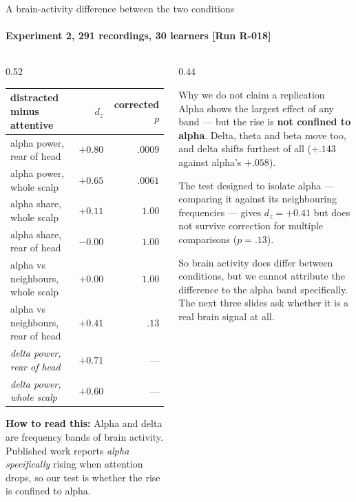 \documentclass[aspectratio=169,10pt]{beamer}
\makeatletter
\newcommand{\runtag}[1]{{\scriptsize\color{mubeamer@gray7}[#1]}}
\newcommand{\sidenote}[1]{{\scriptsize\color{mubeamer@gray7}\sloppy\par#1\par}}
\newcommand{\reads}[1]{\textbf{How to read this:} #1}
\makeatother
\begin{document}
\begin{frame}{A brain-activity difference between the two conditions}
  \framesubtitle{Experiment 2, 291 recordings, 30 learners \runtag{Run R-018}}
  \begin{columns}[T]
    \begin{column}{0.52\textwidth}
      \scriptsize
      \begin{tabular}{@{}lrr@{}}
        \toprule
        distracted minus attentive & $d_z$ & corrected $p$ \\
        \midrule
        alpha power, rear of head  & $+0.80$ & $.0009$ \\
        alpha power, whole scalp   & $+0.65$ & $.0061$ \\
        alpha share, whole scalp   & $+0.11$ & $1.00$ \\
        alpha share, rear of head  & $-0.00$ & $1.00$ \\
        alpha vs neighbours, whole scalp & $+0.00$ & $1.00$ \\
        alpha vs neighbours, rear of head & $+0.41$ & $.13$ \\
        \midrule
        \textit{delta power, rear of head} & $+0.71$ & --- \\
        \textit{delta power, whole scalp}  & $+0.60$ & --- \\
        \bottomrule
      \end{tabular}

      \vspace{0.4em}
      \sidenote{\reads{Alpha and delta are frequency bands of brain activity.
      Published work reports \emph{alpha specifically} rising when attention
      drops, so our test is whether the rise is confined to alpha.}}
    \end{column}
    \begin{column}{0.44\textwidth}
      \begin{block}{Why we do not claim a replication}
        \small
        Alpha shows the largest effect of any band --- but the rise is
        \textbf{not confined to alpha}. Delta, theta and beta move too, and
        delta shifts furthest of all ($+.143$ against alpha's $+.058$).

        \vspace{0.3em}
        The test designed to isolate alpha --- comparing it against its
        neighbouring frequencies --- gives $d_z = +0.41$ but does not survive
        correction for multiple comparisons ($p = .13$).
      \end{block}
      \sidenote{So brain activity does differ between conditions, but we cannot
      attribute the difference to the alpha band specifically. The next three
      slides ask whether it is a real brain signal at all.}
    \end{column}
  \end{columns}
\end{frame}
\end{document}
